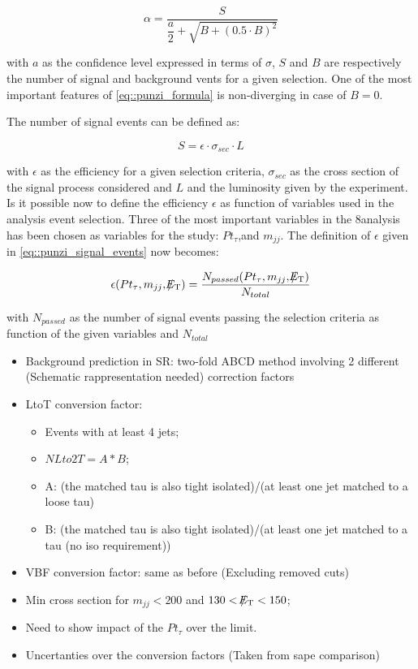 \begin{equation}
\alpha = \dfrac{S}{\dfrac{a}{2} + \sqrt{B + (0.5 \cdot B)^{2}}}
\label{eq::punzi_formula}
\end{equation}

with $a$ as the confidence level expressed in terms of $\sigma$, $S$ and $B$ are respectively the number of signal and background vents for a given selection. One of the most important features of \autoref{eq::punzi_formula} is non-diverging in case of $B = 0$.

The number of signal events can be defined as:

\begin{equation}
S = \epsilon \cdot \sigma_{sec} \cdot L
\label{eq::punzi_signal_events}
\end{equation}

with $\epsilon$ as the efficiency for a given selection criteria, $\sigma_{sec}$ as the cross section of the signal process considered and $L$ and the luminosity given by the experiment. Is it possible now to define the efficiency $\epsilon$ as function of variables used in the analysis event selection. Three of the most important variables in the 8\tev analysis has been chosen as variables for the study: $Pt_{\tau}$,\met and $m_{jj}$. The definition of $\epsilon$ given in \autoref{eq::punzi_signal_events} now becomes:

\begin{equation}
\epsilon ( Pt_{\tau} , m_{jj} ,  \slash\mkern-12mu{E}_{\text{T}} ) = \dfrac{N_{passed}(Pt_{\tau} , m_{jj} ,  \slash\mkern-12mu{E}_{\text{T}})}{N_{total}}
\label{eq::punzi_efficiency}
\end{equation}

with $N_{passed}$ as the number of signal events passing the selection criteria as function of the given variables and $N_{total}$



\begin{itemize}
	
	\item Background prediction in SR: two-fold ABCD method involving 2 different (Schematic rappresentation needed) correction factors
	\item LtoT conversion factor:
	\begin{itemize}
		\item Events with at least 4 jets;
		\item $NLto2T = A * B$;
		\item A: (the matched tau is also tight isolated)/(at least one jet matched to a loose tau)
		\item B: (the matched tau is also tight isolated)/(at least one jet matched to a tau (no iso requirement))
	\end{itemize}
		\item VBF conversion factor: same as before (Excluding removed cuts)
		\item Min cross section for $m_{jj} < 200$ and $130 < \slash\mkern-12mu{E}_{\text{T}} < 150$;
		\item Need to show impact of the $Pt_{\tau}$ over the limit.
		\item Uncertanties over the conversion factors (Taken from sape comparison)
\end{itemize}

